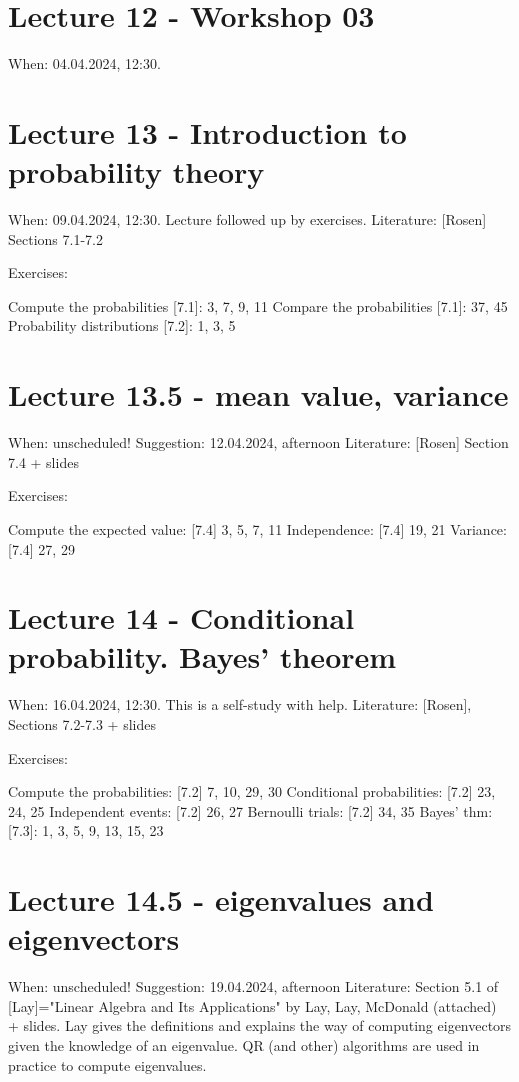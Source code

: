 \documentclass[11pt,oneside,a4paper,openright]{article}
\begin{document}
\section*{Lecture 12 - Workshop 03}

When: 04.04.2024, 12:30.

\section*{Lecture 13 - Introduction to probability theory}

When: 09.04.2024, 12:30. Lecture followed up by exercises.
Literature: [Rosen] Sections 7.1-7.2

Exercises:

Compute the probabilities [7.1]: 3, 7, 9, 11
Compare the probabilities [7.1]: 37, 45
Probability distributions [7.2]: 1, 3, 5

\section*{Lecture 13.5 - mean value, variance}

When: unscheduled! Suggestion: 12.04.2024, afternoon
Literature: [Rosen] Section 7.4 + slides

Exercises:

Compute the expected value: [7.4] 3, 5, 7, 11
Independence: [7.4] 19, 21
Variance: [7.4] 27, 29

\section*{Lecture 14 - Conditional probability. Bayes' theorem}

When: 16.04.2024, 12:30. This is a self-study with help.
Literature: [Rosen], Sections 7.2-7.3 + slides

Exercises:

Compute the probabilities: [7.2] 7, 10, 29, 30
Conditional probabilities: [7.2] 23, 24, 25
Independent events: [7.2] 26, 27
Bernoulli trials: [7.2] 34, 35
Bayes' thm: [7.3]: 1, 3, 5, 9, 13, 15, 23

\section*{Lecture 14.5 - eigenvalues and eigenvectors}

When: unscheduled! Suggestion: 19.04.2024, afternoon
Literature: Section 5.1 of [Lay]="Linear Algebra and Its Applications" by Lay, Lay, McDonald (attached) + slides. Lay gives the definitions and explains the way of computing eigenvectors given the knowledge of an eigenvalue. QR (and other) algorithms are used in practice to compute eigenvalues.
\end{document}
